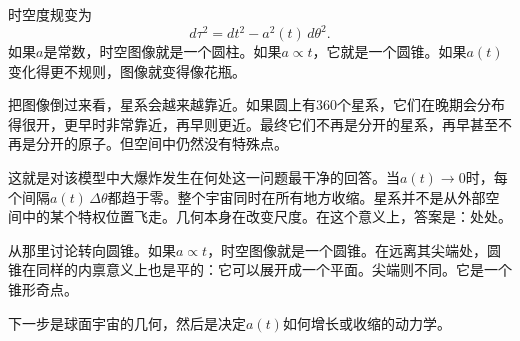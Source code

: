 时空度规变为
\begin{equation}
d\tau^2=dt^2-a^2(t)\,d\theta^2.
\end{equation}
如果\(a\)是常数，时空图像就是一个圆柱。如果\(a\propto t\)，它就是一个圆锥。如果\(a(t)\)变化得更不规则，图像就变得像花瓶。

把图像倒过来看，星系会越来越靠近。如果圆上有\(360\)个星系，它们在晚期会分布得很开，更早时非常靠近，再早则更近。最终它们不再是分开的星系，再早甚至不再是分开的原子。但空间中仍然没有特殊点。

这就是对该模型中大爆炸发生在何处这一问题最干净的回答。当\(a(t)\to 0\)时，每个间隔\(a(t)\,\Delta\theta\)都趋于零。整个宇宙同时在所有地方收缩。星系并不是从外部空间中的某个特权位置飞走。几何本身在改变尺度。在这个意义上，答案是：处处。

\begin{classroomqa}
\end{classroomqa}

从那里讨论转向圆锥。如果\(a\propto t\)，时空图像就是一个圆锥。在远离其尖端处，圆锥在同样的内禀意义上也是平的：它可以展开成一个平面。尖端则不同。它是一个锥形奇点。

下一步是球面宇宙的几何，然后是决定\(a(t)\)如何增长或收缩的动力学。
